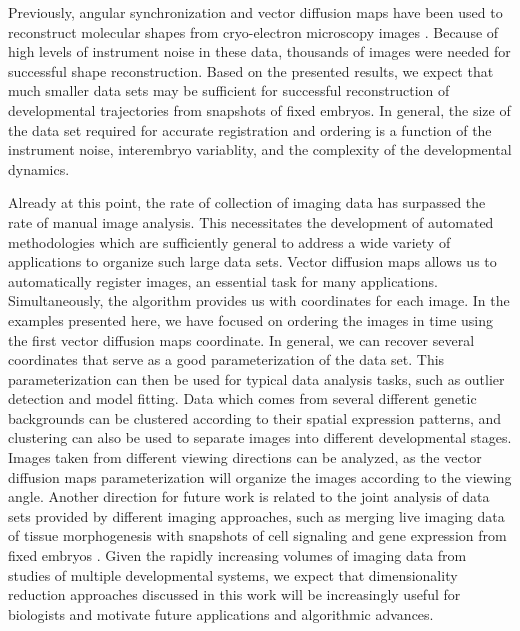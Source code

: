 \documentclass{pnastwo}
\begin{document}
\begin{article}
Previously, angular synchronization and vector diffusion maps have been used to reconstruct molecular shapes from cryo-electron microscopy images \cite{singer2012vector, zhao2014rotationally, singer2011viewing}.
%
Because of high levels of instrument noise in these data, thousands of images were needed for successful shape reconstruction. 
%
Based on the presented results, we expect that much smaller data sets may be sufficient for successful reconstruction of developmental trajectories from snapshots of fixed embryos.
%
In general, the size of the data set required for accurate registration and ordering is a function of the instrument noise, interembryo variablity, and the complexity of the developmental dynamics.
%
 
Already at this point, the rate of collection of imaging data has surpassed the rate of manual image analysis.
%
This necessitates the development of automated methodologies which are sufficiently general to address a wide variety of applications to organize such large data sets.
%
Vector diffusion maps allows us to automatically register images, an essential task for many applications.
%
Simultaneously, the algorithm provides us with coordinates for each image.
%
In the examples presented here, we have focused on ordering the images in time using the first vector diffusion maps coordinate.
%
In general, we can recover several coordinates that serve as a good parameterization of the data set.
%
This parameterization can then be used for typical data analysis tasks, such as outlier detection and model fitting.
%
Data which comes from several different genetic backgrounds can be clustered according to their spatial expression patterns, and clustering can also be used to separate images into different developmental stages. 
%
Images taken from different viewing directions can be analyzed, as the vector diffusion maps parameterization will organize the images according to the viewing angle.
%
Another direction for future work is related to the joint analysis of data sets provided by different imaging approaches, such as merging live imaging data of tissue morphogenesis with snapshots of cell signaling and gene expression from fixed embryos \cite{krzic2012multiview, ichikawa2014live, rubel2010coupling}.  
%
Given the rapidly increasing volumes of imaging data from studies of multiple developmental systems, we expect that dimensionality reduction approaches discussed in this work will be increasingly useful for biologists and motivate future applications and algorithmic advances. 
  


\end{article}
\end{document}
